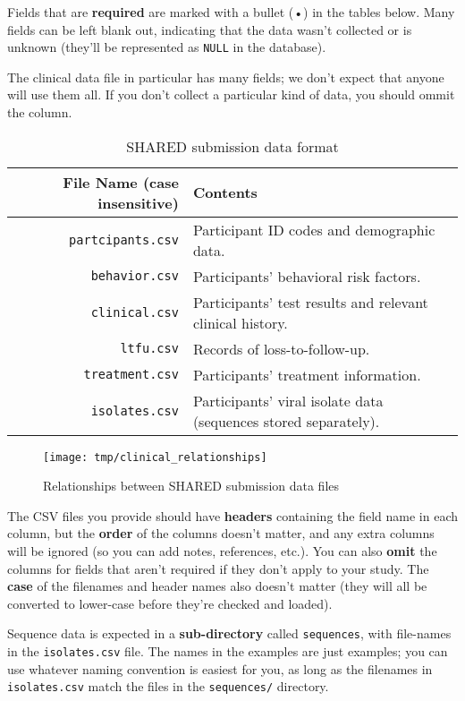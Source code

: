 \documentclass{article}
\begin{document}
Fields that are \textbf{required} are marked with a bullet (•) in the
tables below.  Many fields can be left blank out, indicating that the
data wasn't collected or is unknown (they'll be represented as
\texttt{NULL} in the database).

The clinical data file in particular has many fields; we don't expect
that anyone will use them all. If you don't collect a particular kind
of data, you should ommit the column.


\begin{table}
  \caption{SHARED submission data format}
  \label{tbl:expectedfiles}
  \begin{tabular}{rp{8cm}}
    File Name (case insensitive) & Contents \\ \hline
    \verb|partcipants.csv| & Participant ID codes and demographic data. \\
    \verb|behavior.csv| &  Participants' behavioral risk factors. \\
    \verb|clinical.csv| & Participants' test results and relevant clinical history. \\
    \verb|ltfu.csv| & Records of loss-to-follow-up. \\
    \verb|treatment.csv| &  Participants' treatment information. \\
    \verb|isolates.csv| & Participants' viral isolate data (sequences stored separately). \\
  \end{tabular}
\end{table}

\begin{figure}
  \caption{Relationships between SHARED submission data files}
  \label{fig:relationships}
  \texttt{[image: tmp/clinical\_relationships]}
\end{figure}

The CSV files you provide should have \textbf{headers} containing the
field name in each column, but the \textbf{order} of the columns
doesn't matter, and any extra columns will be ignored (so you can add
notes, references, etc.). You can also \textbf{omit} the columns for
fields that aren't required if they don't apply to your study. The
\textbf{case} of the filenames and header names also doesn't matter
(they will all be converted to lower-case before they're checked and
loaded).

Sequence data is expected in a \textbf{sub-directory} called
\texttt{sequences}, with file-names in the \texttt{isolates.csv}
file. The names in the examples are just examples; you can use
whatever naming convention is easiest for you, as long as the
filenames in \texttt{isolates.csv} match the files in the
\texttt{sequences/} directory.
\end{document}
